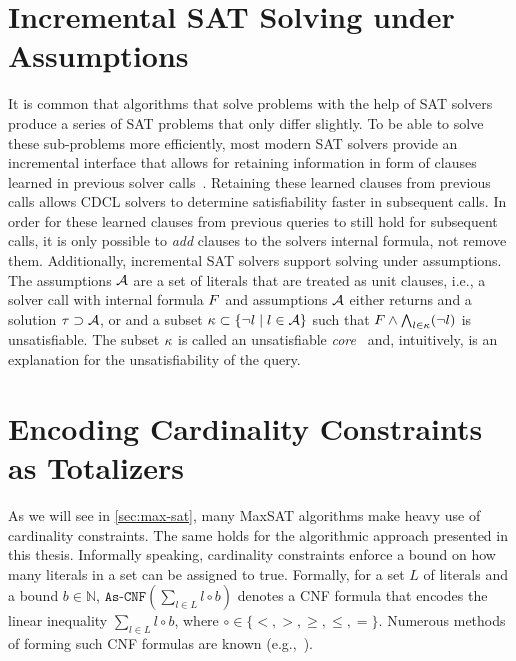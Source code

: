 \section{Incremental SAT Solving under Assumptions\label{sec:inc-sat}}

It is common that algorithms that solve problems with the help of SAT solvers produce a series of SAT problems that only differ slightly.
To be able to solve these sub-problems more efficiently, most modern SAT solvers provide an incremental interface that allows for retaining information in form of clauses learned in previous solver calls~\autocites{DBLP:journals/entcs/EenS03,handbook2-cdcl}.
Retaining these learned clauses from previous calls allows CDCL solvers to determine satisfiability faster in subsequent calls.
In order for these learned clauses from previous queries to still hold for subsequent calls, it is only possible to \emph{add} clauses to the solvers internal formula, not remove them.
Additionally, incremental SAT solvers support solving under assumptions.
The assumptions $\mathcal{A}$ are a set of literals that are treated as unit clauses, i.e., a solver call with internal formula $F$ and assumptions $\mathcal{A}$ either returns \sat{} and a solution $\tau \supset \mathcal{A}$, or \unsat{} and a subset $\kappa \subset \{\lnot l \mid l\in\mathcal{A}\}$ such that $F \land \bigwedge_{l \in \kappa} (\lnot l)$ is unsatisfiable.
The subset $\kappa$ is called an unsatisfiable \emph{core}~\autocite{handbook2-cdcl} and, intuitively, is an explanation for the unsatisfiability of the query.

\section{Encoding Cardinality Constraints as Totalizers\label{sec:card-const}}

As we will see in \cref{sec:max-sat}, many MaxSAT algorithms make heavy use of cardinality constraints.
The same holds for the algorithmic approach presented in this thesis.
Informally speaking, cardinality constraints enforce a bound on how many literals in a set can be assigned to true.
Formally, for a set $L$ of literals and a bound $b \in \mathbb{N}$, $\texttt{As-CNF}\left(\sum_{l \in L} l \circ b\right)$ denotes a CNF formula that encodes the linear inequality $\sum_{l \in L} l \circ b$, where $\circ \in \{< ,> ,\geq, \leq, =\}$.
Numerous methods of forming such CNF formulas are known (e.g.,~\autocites{DBLP:conf/cp/BailleuxB03,DBLP:conf/cp/Sinz05,DBLP:journals/jsat/EenS06}).

